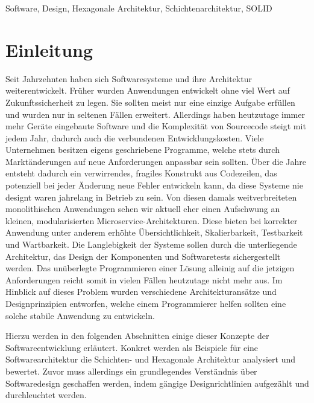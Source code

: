 \documentclass[conference]{IEEEtran}
\begin{document}
\begin{IEEEkeywords}
Software, Design, Hexagonale Architektur, Schichtenarchitektur, SOLID
\end{IEEEkeywords}



\section{Einleitung}



Seit Jahrzehnten haben sich Softwaresysteme und ihre Architektur weiterentwickelt. Früher wurden Anwendungen entwickelt ohne viel Wert auf Zukunftssicherheit zu legen. Sie sollten meist nur eine einzige Aufgabe erfüllen und wurden nur in seltenen Fällen erweitert. Allerdings haben heutzutage immer mehr Geräte eingebaute Software und die Komplexität von Sourcecode steigt mit jedem Jahr, dadurch auch die verbundenen Entwicklungskosten. Viele Unternehmen besitzen eigens geschriebene Programme, welche stets durch Marktänderungen auf neue Anforderungen anpassbar sein sollten. Über die Jahre entsteht dadurch ein verwirrendes, fragiles Konstrukt aus Codezeilen, das potenziell bei jeder Änderung neue Fehler entwickeln kann, da diese Systeme nie designt waren jahrelang in Betrieb zu sein. Von diesen damals weitverbreiteten monolithischen Anwendungen sehen wir aktuell eher einen Aufschwung an kleinen, modularisierten Microservice-Architekturen. Diese bieten bei korrekter Anwendung unter anderem erhöhte Übersichtlichkeit, Skalierbarkeit, Testbarkeit und Wartbarkeit. \cite{Chen.2018} \cite{Dragoni.2017} Die Langlebigkeit der Systeme sollen durch die unterliegende Architektur, das Design der Komponenten und Softwaretests sichergestellt werden. Das unüberlegte Programmieren einer Lösung alleinig auf die jetzigen Anforderungen reicht somit in vielen Fällen heutzutage nicht mehr aus. Im Hinblick auf dieses Problem wurden verschiedene Architekturansätze und Designprinzipien entworfen, welche einem Programmierer helfen sollten eine solche stabile Anwendung zu entwickeln.

Hierzu werden in den folgenden Abschnitten einige dieser Konzepte der Softwareentwicklung erläutert. Konkret werden als Beispiele für eine Softwarearchitektur die Schichten- und Hexagonale Architektur analysiert und bewertet. Zuvor muss allerdings ein grundlegendes Verständnis über Softwaredesign geschaffen werden, indem gängige Designrichtlinien aufgezählt und durchleuchtet werden.
\end{document}
